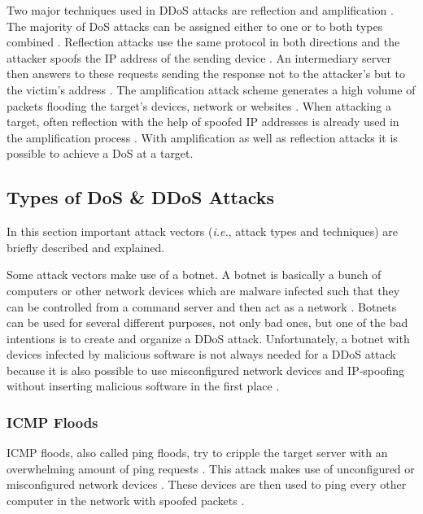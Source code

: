 Two major techniques used in DDoS attacks are reflection and amplification \cite{ReflectionVSAmplification}. The majority of DoS attacks can be assigned either to one or to both types combined \cite{ReflectionVSAmplification}. Reflection attacks use the same protocol in both directions and the attacker spoofs the IP address of the sending device \cite{ReflectionVSAmplification}. An intermediary server then answers to these requests sending the response not to the attacker's but to the victim's address \cite{ReflectionVSAmplification}. The amplification attack scheme generates a high volume of packets flooding the target's devices, network or websites \cite{ReflectionVSAmplification}. When attacking a target, often reflection with the help of spoofed IP addresses is already used in the amplification process \cite{ReflectionVSAmplification}. With amplification as well as reflection attacks it is possible to achieve a DoS at a target. 

\subsection{Types of DoS \& DDoS Attacks}
In this section important attack vectors (\emph{i.e.}, attack types and techniques) are briefly described and explained. 

Some attack vectors make use of a botnet. A botnet is basically a bunch of computers or other network devices which are malware infected such that they can be controlled from a command server and then act as a network \cite{Botnet-ReadWrite}. Botnets can be used for several different purposes, not only bad ones, but one of the bad intentions is to create and organize a DDoS attack. Unfortunately, a botnet with devices infected by malicious software is not always needed for a DDoS attack because it is also possible to use misconfigured network devices and IP-spoofing without inserting malicious software in the first place \cite{Shadowserver, Cloudflare-SSDP}.

\subsubsection*{ICMP Floods}
ICMP floods, also called ping floods, try to cripple the target server with an overwhelming amount of ping requests \cite{DoS-PCWelt, DoS-Comparitech}. This attack makes use of unconfigured or misconfigured network devices \cite{DoS-PaloAlto, DoS-Comparitech}. These devices are then used to ping every other computer in the network with spoofed packets \cite{DoS-Comparitech}. 

